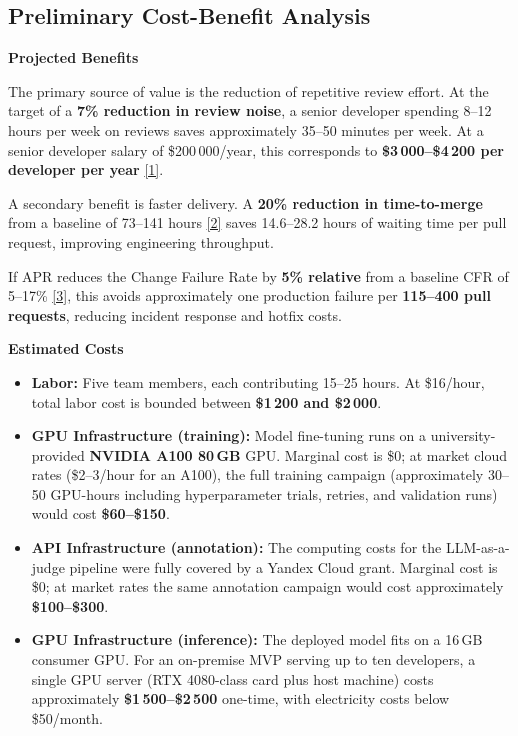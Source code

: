 \documentclass[11pt]{article}
\begin{document}
\subsection*{Preliminary Cost-Benefit Analysis}

\textbf{Projected Benefits}

The primary source of value is the reduction of repetitive review effort. At the target of a \textbf{7\% reduction in review noise}, a senior developer spending 8--12 hours per week on reviews saves approximately 35--50 minutes per week. At a senior developer salary of \$200\,000/year, this corresponds to \textbf{\$3\,000--\$4\,200 per developer per year} \href{https://dev.to/sociilabs/the-40k-code-review-tax-why-manual-reviews-are-bleeding-your-engineering-budget-3485}{[1]}.

A secondary benefit is faster delivery. A \textbf{20\% reduction in time-to-merge} from a baseline of 73--141 hours \href{https://linearb.io/resources/software-engineering-benchmarks-report}{[2]} saves 14.6--28.2 hours of waiting time per pull request, improving engineering throughput.

If APR reduces the Change Failure Rate by \textbf{5\% relative} from a baseline CFR of 5--17\% \href{https://dora.dev/guides/dora-metrics/}{[3]}, this avoids approximately one production failure per \textbf{115--400 pull requests}, reducing incident response and hotfix costs.

\textbf{Estimated Costs}

\begin{itemize}
    \item \textbf{Labor:} Five team members, each contributing 15--25 hours. At \$16/hour, total labor cost is bounded between \textbf{\$1\,200 and \$2\,000}.
    \item \textbf{GPU Infrastructure (training):} Model fine-tuning runs on a university-provided \textbf{NVIDIA A100 80\,GB} GPU. Marginal cost is \$0; at market cloud rates (\$2--3/hour for an A100), the full training campaign (approximately 30--50 GPU-hours including hyperparameter trials, retries, and validation runs) would cost \textbf{\$60--\$150}.
    \item \textbf{API Infrastructure (annotation):} The computing costs for the LLM-as-a-judge pipeline were fully covered by a Yandex Cloud grant. Marginal cost is \$0; at market rates the same annotation campaign would cost approximately \textbf{\$100--\$300}.
    \item \textbf{GPU Infrastructure (inference):} The deployed model fits on a 16\,GB consumer GPU. For an on-premise MVP serving up to ten developers, a single GPU server (RTX 4080-class card plus host machine) costs approximately \textbf{\$1\,500--\$2\,500} one-time, with electricity costs below \$50/month.
\end{itemize}
\end{document}
